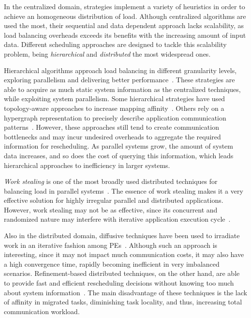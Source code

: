 In the centralized domain, strategies implement a variety of heuristics in order to achieve an homogeneous distribution of load.
Although centralized algorithms are used the most, their sequential and data dependent approach lacks scalability, as load balancing overheads exceeds its benefits with the increasing amount of input data.
Different scheduling approaches are designed to tackle this scalability problem, being \textit{hierarchical} and \textit{distributed} the most widespread ones.

Hierarchical algorithms approach load balancing in different granularity levels, exploring parallelism and delivering better performance~\cite{hybrid}.
These strategies are able to acquire as much static system information as the centralized techniques, while exploiting system parallelism.
Some hierarchical strategies have used topology-aware approaches to increase mapping affinity~\cite{hwtopo,Jeannot2016topo}.
Others rely on a hypergraph representation to precisely describe application communication patterns~\cite{ZoltanParHypRepart07}.
However, these approaches still tend to create communication bottlenecks and may incur undesired overheads to aggregate the required information for rescheduling.
As parallel systems grow, the amount of system data increases, and so does the cost of querying this information, which leads hierarchical approaches to inefficiency in larger systems.

\textit{Work stealing} is one of the most broadly used distributed techniques for balancing load in parallel systems~\cite{Yang18wssurvey,Janjic2013}.
The essence of work stealing makes it a very effective solution for highly irregular parallel and distributed applications.
However, work stealing may not be as effective, since its concurrent and randomized nature may interfere with iterative application execution cycle~\cite{Beri2015hetws}.

Also in the distributed domain, diffusive techniques have been used to irradiate work in an iterative fashion among PEs~\cite{diffus}.
Although such an approach is interesting, since it may not impact much communication costs, it may also have a high convergence time, rapidly becoming inefficient in very imbalanced scenarios.
Refinement-based distributed techniques, on the other hand, are able to provide fast and efficient rescheduling decisions without knowing too much about system information~\cite{grapevine}.
The main disadvantage of these techniques is the lack of affinity in migrated tasks, diminishing task locality, and thus, increasing total communication workload.

